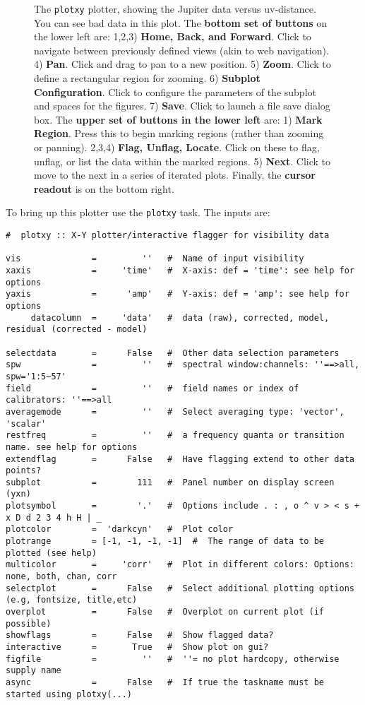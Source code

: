 \begin{figure}[h!]
\begin{center}
\caption{\label{fig:matplotlib}The {\tt plotxy} plotter, showing the
  Jupiter data versus uv-distance.  You can see bad data in this plot.
  The {\bf bottom set of buttons} on the
  lower left are: 1,2,3) {\bf Home, Back, and Forward}. Click to
  navigate between previously defined views (akin to web navigation).
  4) {\bf Pan}. Click and drag to pan to a new position. 5) {\bf
  Zoom}. Click to define a rectangular region for zooming. 6) {\bf
  Subplot Configuration}. Click to configure the parameters of the
  subplot and spaces for the figures. 7) {\bf Save}. Click to launch a
  file save dialog box.  The {\bf upper set of buttons in the lower left} are:
  1) {\bf Mark Region}. Press this to begin marking regions (rather than
  zooming or panning).  2,3,4) {\bf Flag, Unflag, Locate}.  Click on these
  to flag, unflag, or list the data within the marked regions.  5) {\bf Next}.
  Click to move to the next in a series of iterated plots.
  Finally, the {\bf cursor readout} is on the bottom right.}
\hrulefill
\end{center}
\end{figure}

To bring up this plotter use the {\tt plotxy} task.  The inputs are: 
\small
\begin{verbatim}
#  plotxy :: X-Y plotter/interactive flagger for visibility data

vis              =         ''   #  Name of input visibility
xaxis            =     'time'   #  X-axis: def = 'time': see help for options
yaxis            =      'amp'   #  Y-axis: def = 'amp': see help for options
     datacolumn  =     'data'   #  data (raw), corrected, model, residual (corrected - model)

selectdata       =      False   #  Other data selection parameters
spw              =         ''   #  spectral window:channels: ''==>all, spw='1:5~57'
field            =         ''   #  field names or index of calibrators: ''==>all
averagemode      =         ''   #  Select averaging type: 'vector', 'scalar'
restfreq         =         ''   #  a frequency quanta or transition name. see help for options
extendflag       =      False   #  Have flagging extend to other data points?
subplot          =        111   #  Panel number on display screen (yxn)
plotsymbol       =        '.'   #  Options include . : , o ^ v > < s + x D d 2 3 4 h H | _
plotcolor        =  'darkcyn'   #  Plot color
plotrange        = [-1, -1, -1, -1]  #  The range of data to be plotted (see help)
multicolor       =     'corr'   #  Plot in different colors: Options: none, both, chan, corr
selectplot       =      False   #  Select additional plotting options (e.g, fontsize, title,etc)
overplot         =      False   #  Overplot on current plot (if possible)
showflags        =      False   #  Show flagged data?
interactive      =       True   #  Show plot on gui?
figfile          =         ''   #  ''= no plot hardcopy, otherwise supply name
async            =      False   #  If true the taskname must be started using plotxy(...)
\end{verbatim}
\normalsize

